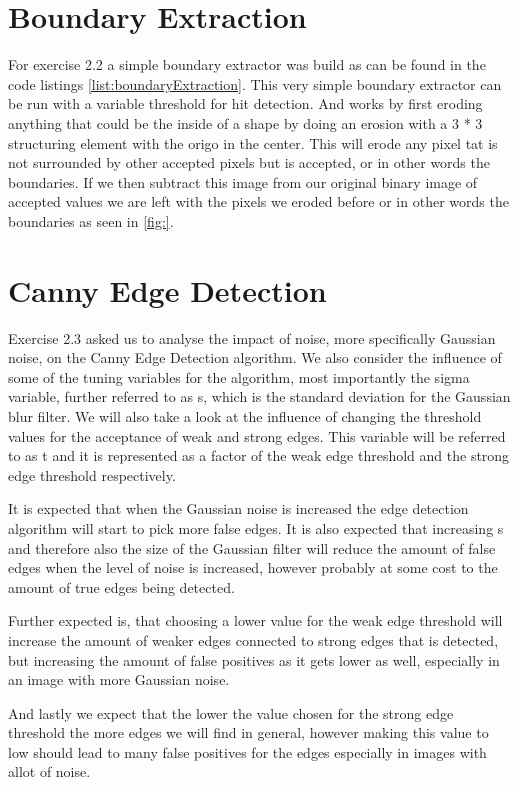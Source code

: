 \documentclass[10pt,a4paper]{article}
\begin{document}
\section{Boundary Extraction}
For exercise 2.2 a simple boundary extractor was build as can be found in the code listings \ref{list:boundaryExtraction}. This very simple boundary extractor can be run with a variable threshold for hit detection. And works by first eroding anything that could be the inside of a shape by doing an erosion with a 3 * 3 structuring element with the origo in the center. This will erode any pixel tat is not surrounded by other accepted pixels but is accepted, or in other words the boundaries. If we then subtract this image from our original binary image of accepted values we are left with the pixels we eroded before or in other words the boundaries as seen in \ref{fig:}.

\section{Canny Edge Detection}
Exercise 2.3 asked us to analyse the impact of noise, more specifically Gaussian noise, on the Canny Edge Detection algorithm. We also consider the influence of some of the tuning variables for the algorithm, most importantly the sigma variable, further referred to as s, which is the standard deviation for the Gaussian blur filter. We will also take a  look at the influence of changing the threshold values for the acceptance of weak and strong edges. This variable will be referred to as t and it is represented as a factor of the weak edge threshold and the strong edge threshold respectively.

It is expected that when the Gaussian noise is increased the edge detection algorithm will start to pick more false edges. It is also expected that increasing s and therefore also the size of the Gaussian filter will reduce the amount of false edges when the level of noise is increased, however probably at some cost to the amount of true edges being detected.

Further expected is, that choosing a lower value for the weak edge threshold will increase the amount of weaker edges connected to strong edges that is detected, but increasing the amount of false positives as it gets lower as well, especially in an image with more Gaussian noise. 

And lastly we expect that the lower the value chosen for the strong edge threshold the more edges we will find in general, however making this value to low should lead to many false positives for the edges especially in images with allot of noise.
\end{document}

